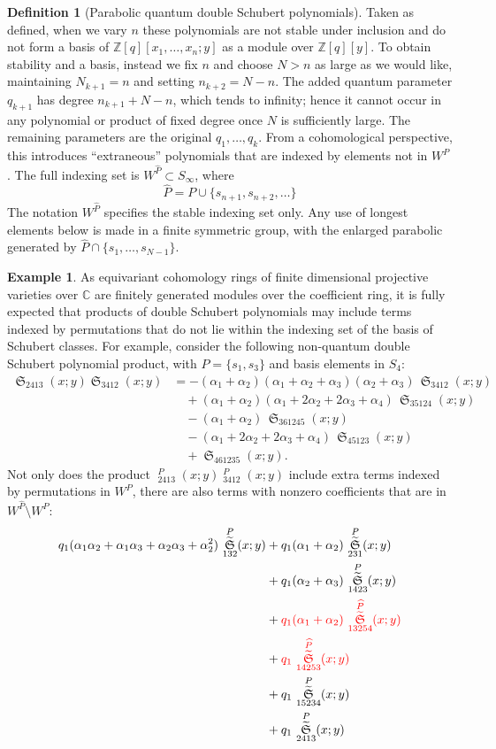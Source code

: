 \documentclass{amsart}
\theoremstyle{definition}
\newtheorem{definition}[lemma]{Definition}
\newtheorem{example}[lemma]{Example}
\theoremstyle{remark}
\numberwithin{equation}{section}
\DeclareMathOperator{\sch}{\mathfrak{S}}
\DeclareMathOperator{\qsch}{\widetilde{\mathfrak{S}}}
\newcommand{\pcomp}[1]{\widehat{#1}}
\begin{document}
\begin{definition}[Parabolic quantum double Schubert polynomials]
	Taken as defined, when we vary $n$ these polynomials are not stable under inclusion and do not form a basis of $\mathbb{Z}[q][x_1,\ldots,x_n;y]$ as a module over $\mathbb{Z}[q][y]$. To obtain stability and a basis, instead we fix $n$ and choose $N>n$ as large as we would like, maintaining $N_{k+1}=n$ and setting $n_{k+2} = N-n$. The added quantum parameter $q_{k+1}$ has degree $n_{k+1}+N-n$, which tends to infinity; hence it cannot occur in any polynomial or product of fixed degree once $N$ is sufficiently large. The remaining parameters are the original $q_1,\ldots,q_k$. From a cohomological perspective, this introduces ``extraneous'' polynomials that are indexed by elements not in $W^P$. The full indexing set is $W^{\pcomp{P}}\subset S_\infty$, where
	$$\pcomp{P} = P \cup \{s_{n+1},s_{n+2},\ldots\}$$
		The notation $W^{\pcomp P}$ specifies the stable indexing set only. Any use of longest elements below is made in a finite symmetric group, with the enlarged parabolic generated by $\pcomp P\cap\{s_1,\ldots,s_{N-1}\}$.
\end{definition}

\begin{example}
As equivariant cohomology rings of finite dimensional projective varieties over $\mathbb{C}$ are finitely generated modules over the coefficient ring, it is fully expected that products of double Schubert polynomials may include terms indexed by permutations that do not lie within the indexing set of the basis of Schubert classes. For example, consider the following non-quantum double Schubert polynomial product, with $P=\{s_1,s_3\}$ and basis elements in $S_4$:
\begin{align*}
\sch_{2413}(x;y)\sch_{3412}(x;y)
&= - (\alpha_1+\alpha_2)(\alpha_1+\alpha_2+\alpha_3)(\alpha_2+\alpha_3)\,\sch_{3412}(x;y) \\
&\quad + (\alpha_1+\alpha_2)(\alpha_1+2\alpha_2+2\alpha_3+\alpha_4)\,\sch_{35124}(x;y) \\
&\quad - (\alpha_1+\alpha_2)\,\sch_{361245}(x;y) \\
&\quad - (\alpha_1+2\alpha_2+2\alpha_3+\alpha_4)\,\sch_{45123}(x;y) \\
&\quad + \sch_{461235}(x;y).
\end{align*}
Not only does the product $\qsch_{2413}^{P}(x;y)\qsch_{3412}^{P}(x;y)$ include extra terms indexed by permutations in $W^P$, there are also terms with nonzero coefficients that are in $W^{\pcomp{P}}\setminus W^P$:
\begin{align*}
q_1(\alpha_1\alpha_2+\alpha_1\alpha_3+\alpha_2\alpha_3+\alpha_2^2)\,\qsch_{132}^{P}(x;y)
&+ q_1(\alpha_1+\alpha_2)\,\qsch_{231}^{P}(x;y) \\
&+ q_1(\alpha_2+\alpha_3)\,\qsch_{1423}^{P}(x;y) \\
&+ \color{red}{q_1(\alpha_1+\alpha_2)\,\qsch_{13254}^{\pcomp{P}}(x;y)} \\
&+ \color{red}{q_1\,\qsch_{14253}^{\pcomp{P}}(x;y)} \\
&+ q_1\,\qsch_{15234}^{P}(x;y) \\
&+ q_1\,\qsch_{2413}^{P}(x;y)
\end{align*}
\end{example}
\end{document}
